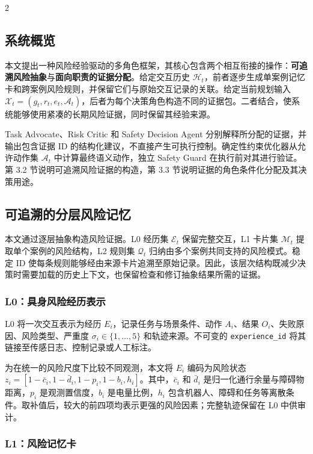 \documentclass[10pt]{article}
\newcommand{\code}[1]{\texttt{#1}}
\begin{document}
\begin{multicols}{2}

\subsection{系统概览}

本文提出一种风险经验驱动的多角色框架，其核心包含两个相互衔接的操作：\textbf{可追溯风险抽象}与\textbf{面向职责的证据分配}。给定交互历史 $\mathcal{H}_t$，前者逐步生成单案例记忆卡和跨案例风险规则，并保留它们与原始交互记录的关联。给定当前规划输入 $\mathcal{X}_t=(g_t,r_t,e_t,\mathcal{A}_t)$，后者为每个决策角色构造不同的证据包。二者结合，使系统能够使用紧凑的长期风险证据，同时保留其经验来源。

Task Advocate、Risk Critic 和 Safety Decision Agent 分别解释所分配的证据，并输出包含证据 ID 的结构化建议，不直接产生可执行控制。确定性约束优化器从允许动作集 $\mathcal{A}_t$ 中计算最终语义动作，独立 Safety Guard 在执行前对其进行验证。第 3.2 节说明可追溯风险证据的构造，第 3.3 节说明证据的角色条件化分配及其决策用途。

\subsection{可追溯的分层风险记忆}

本文通过逐层抽象构造风险证据。L0 经历集 $\mathcal{E}_t$ 保留完整交互，L1 卡片集 $\mathcal{M}_t$ 提取单个案例的风险结构，L2 规则集 $\mathcal{Q}_t$ 归纳由多个案例共同支持的风险模式。稳定 ID 使每条规则能够经由来源卡片追溯至原始记录。因此，该层次结构既减少决策时需要加载的历史上下文，也保留检查和修订抽象结果所需的证据。

\subsubsection{L0：具身风险经历表示}

L0 将一次交互表示为经历 $E_i$，记录任务与场景条件、动作 $A_i$、结果 $O_i$、失败原因、风险类型、严重度 $\sigma_i\in\{1,\ldots,5\}$ 和轨迹来源。不可变的 \code{experience\_id} 将其链接至传感日志、控制记录或人工标注。

为在统一的风险尺度下比较不同观测，本文将 $E_i$ 编码为风险状态 $z_i=[1-\bar c_i,1-\bar d_i,1-p_i,1-b_i,h_i]$。其中，$\bar c_i$ 和 $\bar d_i$ 是归一化通行余量与障碍物距离，$p_i$ 是观测置信度，$b_i$ 是电量比例，$h_i$ 包含机器人、障碍和任务等离散条件。取补值后，较大的前四项均表示更强的风险因素；完整轨迹保留在 L0 中供审计。

\subsubsection{L1：风险记忆卡}


\end{multicols}
\end{document}
